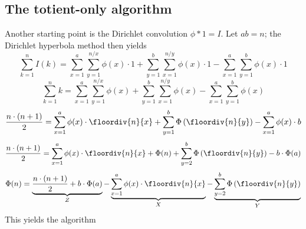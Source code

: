 \documentclass{article}
\title{}
\author{Lucas A. Brown}
\date{\currentdatetime}
\newcommand{\eqn}[1]{\begin{displaymath} #1 \end{displaymath}}
\begin{document}
\maketitle %

\begin{abstract}

\end{abstract}

\setlength{\bibitemsep}{\parskip}
\printbibliography[heading=bibnumbered]

\subsection{The totient-only algorithm}

Another starting point is the Dirichlet convolution $\phi * 1 = I$.  Let $ab=n$; the Dirichlet hyperbola method then yields
\eqn{\sum_{k=1}^n I(k) = \sum_{x=1}^a \sum_{y=1}^{n/x} \phi(x) \cdot 1 + \sum_{y=1}^b \sum_{x=1}^{n/y} \phi(x) \cdot 1 - \sum_{x=1}^a \sum_{y=1}^b \phi(x) \cdot 1}
\eqn{\sum_{k=1}^n k = \sum_{x=1}^a \sum_{y=1}^{n/x} \phi(x) + \sum_{y=1}^b \sum_{x=1}^{n/y} \phi(x) - \sum_{x=1}^a \sum_{y=1}^b \phi(x)}
\eqn{\frac{n \cdot (n+1)}{2} = \sum_{x=1}^a \phi(x) \cdot \floordiv{n}{x} + \sum_{y=1}^b \Phi\left(\floordiv{n}{y}\right) - \sum_{x=1}^a \phi(x) \cdot b}
\eqn{\frac{n \cdot (n+1)}{2} = \sum_{x=1}^a \phi(x) \cdot \floordiv{n}{x} + \Phi(n) + \sum_{y=2}^b \Phi\left(\floordiv{n}{y}\right) - b \cdot \Phi(a)}
\eqn{\Phi(n) = \underbrace{\frac{n \cdot (n+1)}{2} + b \cdot \Phi(a)}_Z - \underbrace{\sum_{x=1}^a \phi(x) \cdot \floordiv{n}{x}}_X - \underbrace{\sum_{y=2}^b \Phi\left(\floordiv{n}{y}\right)}_Y}
This yields the algorithm
\end{document}
